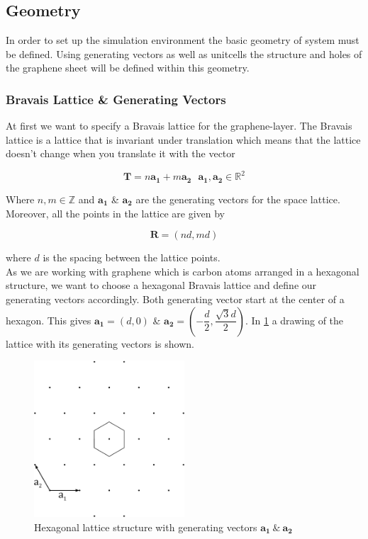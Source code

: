 \subsection{Geometry}

In order to set up the simulation environment the basic geometry of system must be defined. Using generating vectors as well as unitcells the structure and holes of the graphene sheet will be defined within this geometry. 

\subsubsection{Bravais Lattice \& Generating Vectors}
At first we want to specify a Bravais lattice for the graphene-layer. The Bravais lattice is a lattice that is invariant under translation which means that the lattice doesn't change when you translate it with the vector 

\begin{equation}
    \mathbf{T}=n\mathbf{a_{1}}+m\mathbf{a_{2}}\ \ \ \mathbf{a_{1}},\mathbf{a_{2}} \in \mathbb{R}^{2} 
\end{equation}

Where $n,m \in \mathbb{Z}$ and $\mathbf{a_{1}}$ \& $\mathbf{a_{2}}$ are the generating vectors for the space lattice. Moreover, all the points in the lattice are given by 

\begin{equation}
    \mathbf{R}=(nd,md) 
\end{equation}

where $d$ is the spacing between the lattice points. \\
As we are working with graphene which is carbon atoms arranged in a hexagonal structure, we want to choose a hexagonal Bravais lattice and define our generating vectors accordingly. Both generating vector start at the center of a hexagon. This gives $\mathbf{a_{1}}=(d,0)$ \& $\mathbf{a_{2}}=\left(-\dfrac{d}{2},\dfrac{\sqrt{3}d}{2}\right)$. In \cref{hexagon} a drawing of the lattice with its generating vectors is shown.

\begin{figure}
  \centering
  \includegraphics[width=0.5\textwidth]{Figures/hexagon.eps}
  \caption{Hexagonal lattice structure with generating vectors $\mathbf{a_{1}} \ \& \ \mathbf{a_{2}}$}
  \label{hexagon}
\end{figure}
